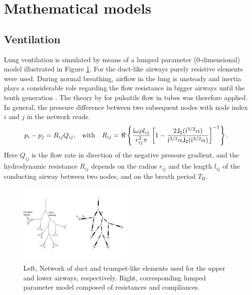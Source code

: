 \section{Mathematical models} \label{sec:mathematial_model}


\subsection{Ventilation} \label{ssec:ducts}
Lung ventilation is simulated by means of a lumped parameter (0-dimensional) model illustrated in Figure \ref{fig:lumpedparametermodel}.
For the duct-like airways purely resistive elements were used.
During normal breathing, airflow in the lung is unsteady and inertia plays a considerable role regarding the flow resistance in bigger airways until the tenth generation \citep{Kaczka2011}.
The theory by \citet{Womersley1957} for pulsatile flow in tubes was therefore applied.
In general, the pressure difference between two subsequent nodes with node index $i$ and $j$ in the network reads.
\begin{equation} \label{eqn:pulsatile_flow_resistance}
p_i - p_j = R_{ij} Q_{ij}\text{,} \quad{\mathrm{with}}\quad R_{ij} = \Re\left\{\frac{\mathrm{i} \omega \rho l_{ij}}{r_{ij}^2 \pi}\left[1-\frac{2\mathsf{J_1}(\mathrm{i}^{3/2}\alpha)}{\mathrm{i}^{3/2}\alpha \mathsf{J_2}(\mathrm{i}^{3/2}\alpha)}\right]^{-1}\right\} \text{.}
\end{equation}
Here $Q_{ij}$ is the flow rate in direction of the negative pressure gradient, and the hydrodynamic resistance $R_{ij}$ depends on the radius $r_{ij}$ and the length $l_{ij}$ of the conducting airway between two nodes, and on the breath period $T_\mathrm{B}$.

\begin{figure}[tb]
\centering
\includegraphics[width=0.5\textwidth]{figures/lumpedparametermodel}
\caption{Left, Network of duct and trumpet-like elements used for the upper and lower airways, respectively. Right, corresponding lumped parameter model composed of resistances and compliances.}
\label{fig:lumpedparametermodel}
\end{figure}


